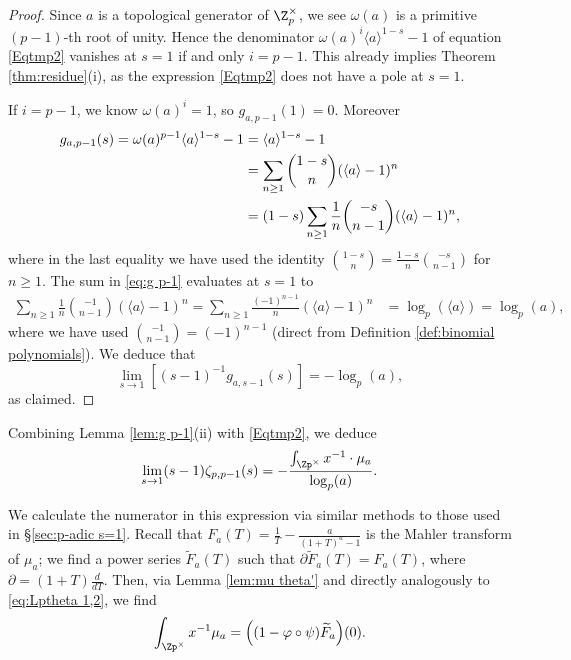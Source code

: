 \documentclass[a4paper,10pt, english, reqno]{smfart}
\numberwithin{equation}{section}
\begin{document}
\begin{proof}
Since $a$ is a topological generator of $\Z_p^\times$, we see $\omega(a)$ is a primitive $(p-1)$-th root of unity. Hence the denominator $\omega(a)^{i}\langle a\rangle^{1-s} - 1$ of equation \eqref{Eqtmp2} vanishes at $s = 1$ if and only $i = p-1$. This already implies Theorem \ref{thm:residue}(i), as the expression \eqref{Eqtmp2} does not have a pole at $s=1$.

If $i = p-1$, we know $\omega(a)^{i} = 1$, so $g_{a,p-1}(1) = 0$. Moreover
\begin{align}
g_{a,p-1}(s) = \omega(a)^{p-1} \langle a \rangle^{1 - s} - 1 \notag &= \langle a \rangle^{1 - s} - 1 \notag\\
&= \sum_{n \geq 1} {{1 - s} \choose n} (\langle a \rangle - 1)^n \notag\\
&= (1 - s) \sum_{n \geq 1} \frac{1}{n} {{-s} \choose {n-1}} (\langle a \rangle - 1)^n, \label{eq:g p-1}
\end{align}
where in the last equality we have used the identity ${{1 - s} \choose n} = \frac{1-s}{n} {{-s} \choose {n-1}}$ for $n \geq 1$. The sum in \eqref{eq:g p-1} evaluates at $s = 1$ to
\begin{align*}
\sum_{n \geq 1} \frac{1}{n} {{-1} \choose {n-1}} (\langle a \rangle - 1)^{n} = \sum_{n \geq 1} \frac{(-1)^{n-1}}{n} (\langle a \rangle - 1)^n
&= \log_p(\langle a \rangle) = \log_p(a),
\end{align*}
where we have used ${ {-1} \choose {n - 1}} = (-1)^{n-1}$ (direct from Definition \ref{def:binomial polynomials}). 
We deduce that
\[ \lim_{s\to 1}[(s-1)^{-1}g_{a,s-1}(s)] = -\log_p(a), \] as claimed.
\end{proof}

Combining Lemma \ref{lem:g p-1}(ii) with \eqref{Eqtmp2}, we deduce
\begin{equation}\label{eq:zeta p residue}
\lim_{s\to1} (s-1)\zeta_{p,p-1}(s)  = -\frac{\int_{\Zp^\times} x^{-1} \cdot \mu_a}{\log_p(a)}.
\end{equation}

We calculate the numerator in this expression via similar methods to those used in \S\ref{sec:p-adic s=1}. Recall that $F_a(T) = \frac{1}{T} - \frac{a}{(1 + T)^a - 1}$ is the Mahler transform of $\mu_a$; we find a power series $\widetilde{F}_a(T)$ such that $\partial \widetilde{F}_a(T) = F_a(T)$, where $\partial = (1 + T) \frac{d}{dT}$. Then, via Lemma \ref{lem:mu theta'} and directly analogously to \eqref{eq:Lptheta 1,2}, we find
\begin{equation}\label{eq:zeta p residue 2}
\int_{\Zp^\times}x^{-1}\mu_a = \Big((1 - \varphi\circ\psi)\widetilde{F}_a\Big)(0).
\end{equation}
\end{document}
